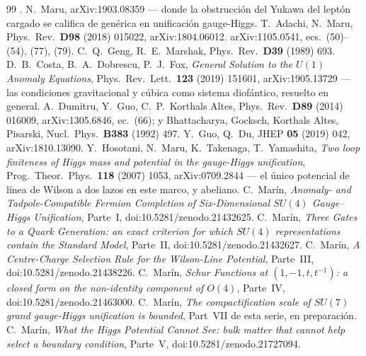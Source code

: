 \documentclass[11pt,a4paper]{article}
\newcommand{\su}[1]{SU(#1)}
\begin{document}
\begin{thebibliography}{99}
\cite{AHMN}.
 N.~Maru, arXiv:1903.08359 --- donde la obstrucción del Yukawa del leptón cargado se
califica de genérica en unificación gauge-Higgs.
 T.~Adachi, N.~Maru, Phys.\ Rev.\ \textbf{D98} (2018) 015022,
arXiv:1804.06012.
 arXiv:1105.0541, ecs.~(50)--(54), (77), (79).
 C.~Q.~Geng, R.~E.~Marshak, Phys.\ Rev.\ \textbf{D39} (1989) 693.
 D.~B.~Costa, B.~A.~Dobrescu, P.~J.~Fox, \emph{General Solution to the $U(1)$ Anomaly
Equations}, Phys.\ Rev.\ Lett.\ \textbf{123} (2019) 151601, arXiv:1905.13729 --- las condiciones
gravitacional y cúbica como sistema diofántico, resuelto en general.
 A.~Dumitru, Y.~Guo, C.~P.~Korthals Altes, Phys.\ Rev.\ \textbf{D89} (2014) 016009,
arXiv:1305.6846, ec.~(66); y Bhattacharya, Gocksch, Korthals Altes, Pisarski, Nucl.\ Phys.\
\textbf{B383} (1992) 497.
 Y.~Guo, Q.~Du, JHEP \textbf{05} (2019) 042, arXiv:1810.13090.
\bibitem{HMTY} Y.~Hosotani, N.~Maru, K.~Takenaga, T.~Yamashita, \emph{Two loop finiteness of Higgs
mass and potential in the gauge-Higgs unification}, Prog.\ Theor.\ Phys.\ \textbf{118} (2007) 1053,
arXiv:0709.2844 --- el único potencial de línea de Wilson a dos lazos en este marco, y abeliano.
\bibitem{PartI} C.~Mar\'in, \emph{Anomaly- and Tadpole-Compatible Fermion Completion of
Six-Dimensional $\su4$ Gauge--Higgs Unification}, Parte~I, doi:10.5281/zenodo.21432625.
\bibitem{PartII} C.~Mar\'in, \emph{Three Gates to a Quark Generation: an exact criterion for which
$\su4$ representations contain the Standard Model}, Parte~II, doi:10.5281/zenodo.21432627.
\bibitem{PartIII} C.~Mar\'in, \emph{A Centre-Charge Selection Rule for the Wilson-Line Potential},
Parte~III, doi:10.5281/zenodo.21438226.
 C.~Mar\'in, \emph{Schur Functions at $(1,-1,t,t^{-1})$: a closed form on the
non-identity component of $O(4)$}, Parte~IV, doi:10.5281/zenodo.21463000.
\bibitem{PartVII} C.~Mar\'in, \emph{The compactification scale of $SU(7)$ grand gauge-Higgs
unification is bounded}, Part~VII de esta serie, en preparación.
\bibitem{PartV} C.~Mar\'in, \emph{What the Higgs Potential Cannot See: bulk matter that cannot help
select a boundary condition}, Parte~V, doi:10.5281/zenodo.21727094.
\end{thebibliography}
\end{document}
